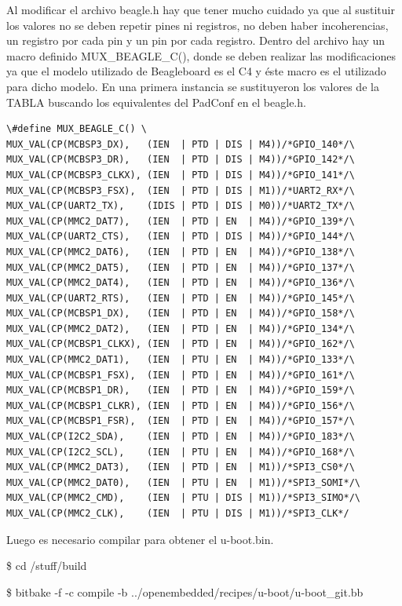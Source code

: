 \bigskip
Al modificar el archivo beagle.h hay que tener mucho cuidado ya que al sustituir los valores no se deben repetir pines ni registros, no deben haber incoherencias, un registro por cada pin y un pin por cada registro. 
Dentro del archivo hay un macro definido MUX\_BEAGLE\_C(), donde se deben realizar las modificaciones ya que el modelo utilizado de Beagleboard es el C4 y éste macro es el utilizado para dicho modelo.
En una primera instancia se sustituyeron los valores de la TABLA buscando los equivalentes del 
PadConf en el beagle.h. 


\begin{verbatim}
\#define MUX_BEAGLE_C() \
MUX_VAL(CP(MCBSP3_DX),   (IEN  | PTD | DIS | M4))/*GPIO_140*/\
MUX_VAL(CP(MCBSP3_DR),   (IEN  | PTD | DIS | M4))/*GPIO_142*/\
MUX_VAL(CP(MCBSP3_CLKX), (IEN  | PTD | DIS | M4))/*GPIO_141*/\
MUX_VAL(CP(MCBSP3_FSX),  (IEN  | PTD | DIS | M1))/*UART2_RX*/\
MUX_VAL(CP(UART2_TX),    (IDIS | PTD | DIS | M0))/*UART2_TX*/\
MUX_VAL(CP(MMC2_DAT7),   (IEN  | PTD | EN  | M4))/*GPIO_139*/\
MUX_VAL(CP(UART2_CTS),   (IEN  | PTD | DIS | M4))/*GPIO_144*/\
MUX_VAL(CP(MMC2_DAT6),   (IEN  | PTD | EN  | M4))/*GPIO_138*/\
MUX_VAL(CP(MMC2_DAT5),   (IEN  | PTD | EN  | M4))/*GPIO_137*/\
MUX_VAL(CP(MMC2_DAT4),   (IEN  | PTD | EN  | M4))/*GPIO_136*/\
MUX_VAL(CP(UART2_RTS),   (IEN  | PTD | EN  | M4))/*GPIO_145*/\
MUX_VAL(CP(MCBSP1_DX),   (IEN  | PTD | EN  | M4))/*GPIO_158*/\
MUX_VAL(CP(MMC2_DAT2),   (IEN  | PTD | EN  | M4))/*GPIO_134*/\
MUX_VAL(CP(MCBSP1_CLKX), (IEN  | PTD | EN  | M4))/*GPIO_162*/\
MUX_VAL(CP(MMC2_DAT1),   (IEN  | PTU | EN  | M4))/*GPIO_133*/\
MUX_VAL(CP(MCBSP1_FSX),  (IEN  | PTD | EN  | M4))/*GPIO_161*/\
MUX_VAL(CP(MCBSP1_DR),   (IEN  | PTD | EN  | M4))/*GPIO_159*/\
MUX_VAL(CP(MCBSP1_CLKR), (IEN  | PTD | EN  | M4))/*GPIO_156*/\
MUX_VAL(CP(MCBSP1_FSR),  (IEN  | PTD | EN  | M4))/*GPIO_157*/\
MUX_VAL(CP(I2C2_SDA),    (IEN  | PTD | EN  | M4))/*GPIO_183*/\
MUX_VAL(CP(I2C2_SCL),    (IEN  | PTU | EN  | M4))/*GPIO_168*/\
MUX_VAL(CP(MMC2_DAT3),   (IEN  | PTD | EN  | M1))/*SPI3_CS0*/\
MUX_VAL(CP(MMC2_DAT0),   (IEN  | PTU | EN  | M1))/*SPI3_SOMI*/\
MUX_VAL(CP(MMC2_CMD),    (IEN  | PTU | DIS | M1))/*SPI3_SIMO*/\
MUX_VAL(CP(MMC2_CLK),    (IEN  | PTU | DIS | M1))/*SPI3_CLK*/
\end{verbatim}

Luego es necesario compilar para obtener el u-boot.bin.

\bigskip
\centerline{\$ cd /stuff/build}

\centerline{\$ bitbake -f -c compile -b ../openembedded/recipes/u-boot/u-boot\_git.bb}

